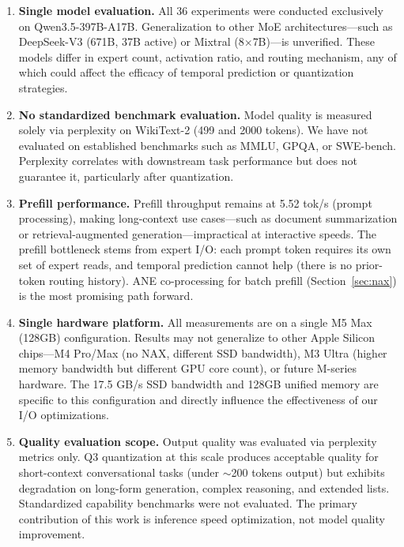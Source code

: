 \documentclass[11pt,twocolumn]{article}
\begin{document}
\begin{enumerate}
    \item \textbf{Single model evaluation.} All 36 experiments were conducted exclusively on Qwen3.5-397B-A17B. Generalization to other MoE architectures---such as DeepSeek-V3 (671B, 37B active) or Mixtral (8$\times$7B)---is unverified. These models differ in expert count, activation ratio, and routing mechanism, any of which could affect the efficacy of temporal prediction or quantization strategies.

    \item \textbf{No standardized benchmark evaluation.} Model quality is measured solely via perplexity on WikiText-2 (499 and 2000 tokens). We have not evaluated on established benchmarks such as MMLU, GPQA, or SWE-bench. Perplexity correlates with downstream task performance but does not guarantee it, particularly after quantization.

    \item \textbf{Prefill performance.} Prefill throughput remains at 5.52 tok/s (prompt processing), making long-context use cases---such as document summarization or retrieval-augmented generation---impractical at interactive speeds. The prefill bottleneck stems from expert I/O: each prompt token requires its own set of expert reads, and temporal prediction cannot help (there is no prior-token routing history). ANE co-processing for batch prefill (Section~\ref{sec:nax}) is the most promising path forward.

    \item \textbf{Single hardware platform.} All measurements are on a single M5 Max (128GB) configuration. Results may not generalize to other Apple Silicon chips---M4 Pro/Max (no NAX, different SSD bandwidth), M3 Ultra (higher memory bandwidth but different GPU core count), or future M-series hardware. The 17.5 GB/s SSD bandwidth and 128GB unified memory are specific to this configuration and directly influence the effectiveness of our I/O optimizations.

    \item \textbf{Quality evaluation scope.} Output quality was evaluated via perplexity metrics only. Q3 quantization at this scale produces acceptable quality for short-context conversational tasks (under $\sim$200 tokens output) but exhibits degradation on long-form generation, complex reasoning, and extended lists. Standardized capability benchmarks were not evaluated. The primary contribution of this work is inference speed optimization, not model quality improvement.
\end{enumerate}
\end{document}
